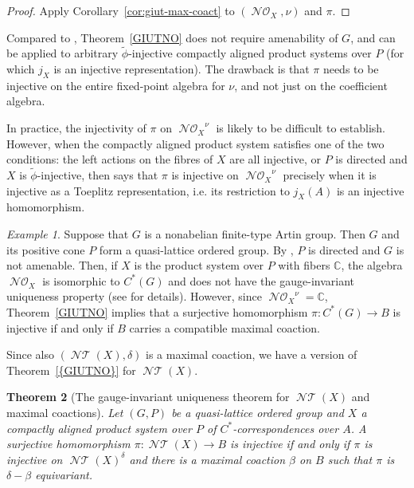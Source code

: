 \documentclass[12pt]{amsart}
\theoremstyle{plain}
\newtheorem{theorem}{Theorem}[section]
\theoremstyle{remark}
\newtheorem{example}[theorem]{Example}
\theoremstyle{definition}
\numberwithin{equation}{section}
\theoremstyle{plain}
\theoremstyle{definition}
\theoremstyle{remark}
\begin{document}
\begin{proof}
Apply Corollary~\ref{cor:giut-max-coact} to $({\operatorname{\mathcal{NO}}_{\!{X}}}, \nu)$ and $\pi$.
\end{proof}

Compared to \cite[Corollary 4.12]{CLSV}, Theorem~\ref{GIUTNO} does
not require amenability of $G$, and can be  applied to arbitrary
$\tilde\phi$-injective compactly aligned product systems over $P$ (for which $j_X$ is an
injective representation). The drawback is that $\pi$ needs to be
injective on the entire fixed-point algebra for $\nu$, and not just on the coefficient
algebra.

In practice, the injectivity of $\pi$ on ${\operatorname{\mathcal{NO}}_{\!{X}}}^\nu$   is likely to be difficult
to establish. However, when the compactly aligned product system satisfies one of the
two conditions: the left actions on the fibres of $X$ are all injective, or $P$ is directed and $X$ is $\tilde\phi$-injective,
then \cite[Theorem 3.8]{CLSV} says that
$\pi$ is injective on ${\operatorname{\mathcal{NO}}_{\!{X}}}^\nu$  precisely when it is injective as a Toeplitz representation, i.e. its restriction to
$j_X(A)$ is an injective homomorphism.

\begin{example} Suppose that $G$ is a nonabelian finite-type Artin group. Then $G$ and
its positive cone $P$ form a quasi-lattice ordered group. By \cite{CLac1}, $P$ is directed
and $G$ is not amenable. Then, if $X$ is the product system over $P$ with fibers ${{\mathbb{{C}}}}$,
the algebra ${\operatorname{\mathcal{NO}}_{\!{X}}}$ is isomorphic to $C^*(G)$ and does not have the gauge-invariant
uniqueness property (see \cite[Remark 5.4]{CLSV} for details).  However, since ${\operatorname{\mathcal{NO}}_{\!{X}}}^\nu={{\mathbb{{C}}}}$,
Theorem~\ref{GIUTNO} implies that a surjective homomorphism $\pi:C^*(G)\to B$ is injective if and only if $B$ carries
a  compatible maximal coaction.
\end{example}

Since also $({\operatorname{\mathcal{NT}}}(X), \delta)$ is a maximal coaction, we have a version of
{Theorem~\textup{\ref{{GIUTNO}}}} for ${\operatorname{\mathcal{NT}}}(X)$.

 \begin{theorem}[The gauge-invariant uniqueness theorem for ${\operatorname{\mathcal{NT}}}(X)$ and maximal coactions]
 Let $(G,P)$ be a quasi-lattice ordered group
 and $X$ a compactly aligned product system over $P$ of $C^*$-correspondences over $A$.
 A surjective homomorphism $\pi:{\operatorname{\mathcal{NT}}}(X)\to B$ is injective if and only if $\pi$ is
injective on ${\operatorname{\mathcal{NT}}}(X)^\delta$ and
 there is a maximal coaction $\beta$ on $B$
 such that $\pi$ is $\delta-\beta$ equivariant.
 \end{theorem}
\end{document}
